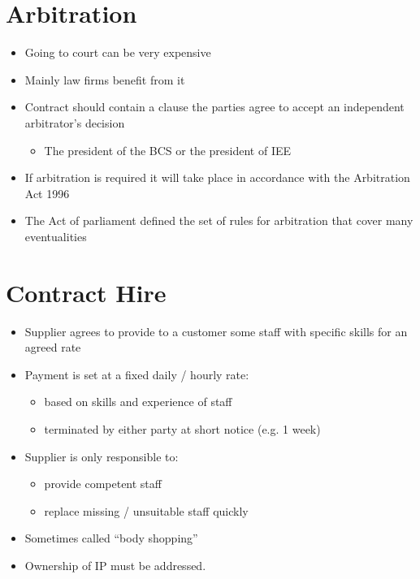 \documentclass{article}
\begin{document}
\section{Arbitration}
\begin{itemize}
\item Going to court can be very expensive
\item Mainly law firms benefit from it
\item Contract should contain a clause the parties agree to accept an independent arbitrator's decision
\begin{itemize}
\item The president of the BCS or the president of IEE
\end{itemize}
\item If arbitration is required it will take place in accordance with the Arbitration Act 1996
\item The Act of parliament defined the set of rules for arbitration that cover many eventualities
\end{itemize}



\section{Contract Hire}
\begin{itemize}
\item Supplier agrees to provide to a customer some staff with specific skills for an agreed rate
\item Payment is set at a fixed daily / hourly rate:
\begin{itemize}
\item based on skills and experience of staff
\item terminated by either party at short notice (e.g. 1 week)
\end{itemize}
\item Supplier is only responsible to:
\begin{itemize}
\item provide competent staff
\item replace missing / unsuitable staff quickly
\end{itemize}
\item Sometimes called ``body shopping''
\item Ownership of IP must be addressed.
\end{itemize}
\end{document}
